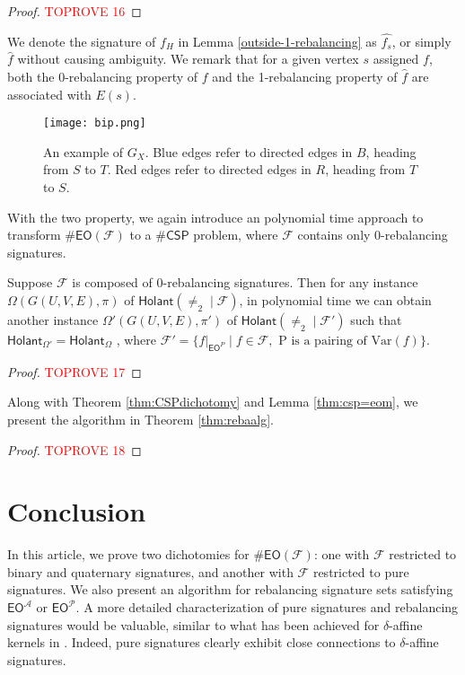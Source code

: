 \documentclass[a4paper,UKenglish,cleveref, autoref, thm-restate]{lipics-v2021}
\newcommand{\hol}[0]{\textsf{Holant}}
\newcommand{\eo}[0]{\textsf{EO}}
\newcommand{\csp}[0]{\textsf{CSP}}
\newcommand{\eom}[1][\text{M}]{\textsf{EO}^{#1}}
\newcommand{\ba}[1][0]{{{#1}-rebalancing}}
\begin{document}
\begin{proof}\textcolor{red}{TOPROVE 16}\end{proof}


We denote the signature of $f_H$ in Lemma \ref{outside-1-rebalancing} as $\hat{f_s}$, or simply $\hat{f}$ without causing ambiguity.
We remark that for a given vertex $s$ assigned $f$, both the 0-rebalancing property of $f$ and the 1-rebalancing property of $\hat{f}$ are associated with $E(s)$. 



\begin{figure}
            \centering
            \texttt{[image: bip.png]}
            \caption{An example of $G_X$. Blue edges refer to directed edges in $B$, heading from $S$ to $T$. Red edges refer to directed edges in $R$, heading from $T$ to $S$.}
            \label{fig:bip}
        \end{figure}


With the two property, we again introduce an polynomial time approach to transform $\#\eo(\mathcal{F})$ to a $\#\csp$ problem, where $\mathcal{F}$ contains only \ba[0] signatures.


\begin{lemma}\label{lem:0rebtocsp}
Suppose $\mathcal{F}$ is composed of \ba[0] signatures. Then for any instance $\Omega(G(U,V,E),\pi)$ of $\hol(\neq_2\mid\mathcal{F})$, in polynomial time we can obtain another instance $\Omega'(G(U,V,E),\pi')$ of $\hol(\neq_2\mid\mathcal{F}')$ such that $\hol_{\Omega'}=\hol_\Omega$ , where $\mathcal{F}'=\{f|_{\eom[P]}\mid f\in\mathcal{F},\text{ P is a pairing of Var}(f)\}$. 
\end{lemma}

\begin{proof}\textcolor{red}{TOPROVE 17}\end{proof}

Along with Theorem \ref{thm:CSPdichotomy} and Lemma \ref{thm:csp=eom}, we present the algorithm in Theorem \ref{thm:rebaalg}.

\begin{proof}\textcolor{red}{TOPROVE 18}\end{proof}
\section{Conclusion}\label{sec:ccls}

In this article, we prove two dichotomies for $\#\eo(\mathcal{F})$: one with $\mathcal{F}$ restricted to binary and quaternary signatures, and another with $\mathcal{F}$ restricted to pure signatures. We also present an algorithm for rebalancing signature sets satisfying $\eom[\mathscr{A}]$ or $\eom[\mathscr{P}]$. A more detailed characterization of pure signatures and rebalancing signatures would be valuable, similar to what has been achieved for $\delta$-affine kernels in \cite{shao2024eulerian}. Indeed, pure signatures clearly exhibit close connections to $\delta$-affine signatures.
\end{document}
